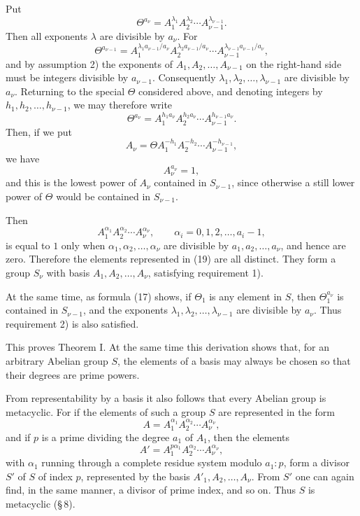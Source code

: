 \documentclass[11pt]{article}
\begin{document}
Put
\begin{equation}
\Theta^{a_\nu}=A_1^{\lambda_1}A_2^{\lambda_2}\cdots A_{\nu-1}^{\lambda_{\nu-1}}.
\tag{17}
\end{equation}
Then all exponents $\lambda$ are divisible by $a_\nu$. For
\[
\Theta^{a_{\nu-1}}=A_1^{\lambda_1 a_{\nu-1}/a_\nu}
A_2^{\lambda_2 a_{\nu-1}/a_\nu}
\cdots
A_{\nu-1}^{\lambda_{\nu-1}a_{\nu-1}/a_\nu},
\]
and by assumption 2) the exponents of $A_1,A_2,
\ldots,A_{\nu-1}$ on the right-hand side must be integers divisible by $a_{\nu-1}$. Consequently $\lambda_1,
\lambda_2,
\ldots,
\lambda_{\nu-1}$ are divisible by $a_\nu$. Returning to the special $\Theta$ considered above, and denoting integers by $h_1,h_2,
\ldots,h_{\nu-1}$, we may therefore write
\[
\Theta^{a_\nu}=A_1^{h_1a_\nu}A_2^{h_2a_\nu}\cdots A_{\nu-1}^{h_{\nu-1}a_\nu}.
\]
Then, if we put
\[
A_\nu=\Theta A_1^{-h_1}A_2^{-h_2}\cdots A_{\nu-1}^{-h_{\nu-1}},
\]
we have
\begin{equation}
A_\nu^{a_\nu}=1,
\tag{18}
\end{equation}
and this is the lowest power of $A_\nu$ contained in $S_{\nu-1}$, since otherwise a still lower power of $\Theta$ would be contained in $S_{\nu-1}$.

Then
\begin{equation}
A_1^{\alpha_1}A_2^{\alpha_2}\cdots A_\nu^{\alpha_\nu},
\qquad
\alpha_i=0,1,2,\ldots,a_i-1,
\tag{19}
\end{equation}
is equal to $1$ only when $\alpha_1,\alpha_2,
\ldots,
\alpha_\nu$ are divisible by $a_1,a_2,
\ldots,a_\nu$, and hence are zero. Therefore the elements represented in (19) are all distinct. They form a group $S_\nu$ with basis $A_1,A_2,
\ldots,A_\nu$, satisfying requirement 1).

At the same time, as formula (17) shows, if $\Theta_1$ is any element in $S$, then $\Theta_1^{a_\nu}$ is contained in $S_{\nu-1}$, and the exponents $\lambda_1,
\lambda_2,
\ldots,
\lambda_{\nu-1}$ are divisible by $a_\nu$. Thus requirement 2) is also satisfied.

This proves Theorem I. At the same time this derivation shows that, for an arbitrary Abelian group $S$, the elements of a basis may always be chosen so that their degrees are prime powers.

From representability by a basis it also follows that every Abelian group is metacyclic. For if the elements of such a group $S$ are represented in the form
\[
A=A_1^{\alpha_1}A_2^{\alpha_2}\cdots A_\nu^{\alpha_\nu},
\]
and if $p$ is a prime dividing the degree $a_1$ of $A_1$, then the elements
\[
A'=A_1^{p\alpha_1}A_2^{\alpha_2}\cdots A_\nu^{\alpha_\nu},
\]
with $\alpha_1$ running through a complete residue system modulo $a_1:p$, form a divisor $S'$ of $S$ of index $p$, represented by the basis $A'_1,A_2,
\ldots,A_\nu$. From $S'$ one can again find, in the same manner, a divisor of prime index, and so on. Thus $S$ is metacyclic (\S\,8).
\end{document}
